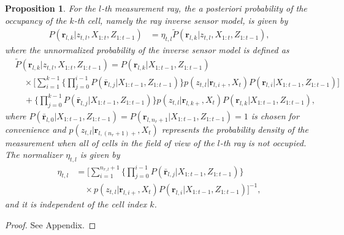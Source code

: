 \documentclass[smallextended]{svjour3}       %
\newtheorem{prop}{Proposition}
\begin{document}
\begin{prop}
For the $l$-th measurement ray, the a posteriori probability of the occupancy of the $k$-th cell, namely the ray inverse sensor model, is given by
\begin{align}
\label{eqn:RayISMAnswer}
P(\mathbf{r}_{l,k}|z_{t,l},X_{1:t},Z_{1:t-1})&=\eta_{t,l}\tilde P(\mathbf{r}_{l,k}|z_{t,l},X_{1:t},Z_{1:t-1}),
\end{align}
where the unnormalized probability of the inverse sensor model is defined as
\begin{align}
\label{eqn:Unnormalized}
& \tilde P(\mathbf{r}_{l,k}|z_{t,l},X_{1:t},Z_{1:t-1})%
=P(\mathbf{r}_{l,k}|X_{1:t-1},Z_{1:t-1})\nonumber\\
&\quad\times 
\bigg[\sum_{i=1}^{k-1}\bigg\{\prod_{j=0}^{i-1}P(\bar{\mathbf{r}}_{l,j}|X_{1:t-1},Z_{1:t-1})\bigg\}%
p(z_{t,l}|\mathbf{r}_{l,i+},X_t)P(\mathbf{r}_{l,i}|X_{1:t-1},Z_{1:t-1})\bigg]\nonumber\\
&\quad + \bigg\{\prod_{j=0}^{k-1}P(\bar{\mathbf{r}}_{l,j}|X_{1:t-1},Z_{1:t-1})\bigg\}%
p(z_{t,l}|\mathbf{r}_{l,k+},X_t)P(\mathbf{r}_{l,k}|X_{1:t-1},Z_{1:t-1}),
\end{align}
where $P(\bar{\mathbf{r}}_{l,0}|X_{1:t-1},Z_{1:t-1})=P(\mathbf{r}_{l,n_r+1}|X_{1:t-1},Z_{1:t-1})=1$ is chosen for convenience and $p(z_{t,l}|\mathbf{r}_{l,(n_r+1)+},X_t)$ represents the probability density of the measurement when all of cells in the field of view of the $l$-th ray is not occupied. The normalizer $\eta_{t,l}$ is given by
\begin{align}
\label{eqn:allEta}
\eta_{t,l}
&=
\bigg[\sum_{i=1}^{n_{r,l}+1}\bigg\{\prod_{j=0}^{i-1}P(\bar{\mathbf{r}}_{l,j}|X_{1:t-1},Z_{1:t-1})\bigg\}\nonumber\\&\quad\times p(z_{t,l}|\mathbf{r}_{l,i+},X_t)P(\mathbf{r}_{l,i}|X_{1:t-1},Z_{1:t-1})\bigg]^{-1},
\end{align}
and it is independent of the cell index $k$.
\end{prop}
\begin{proof}
See Appendix.
\end{proof}
\end{document}
